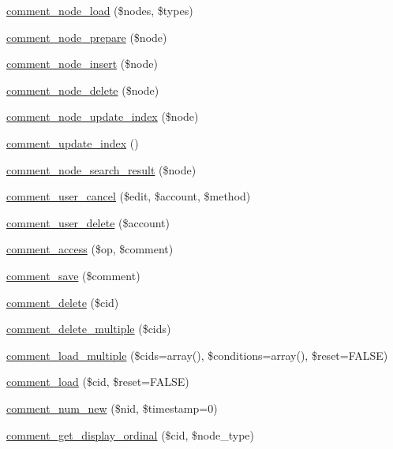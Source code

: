 \begin{DoxyCompactItemize}
\item 
\hyperlink{comment_8module_a3b04740955116c2ec6ec12db5f991d7c}{comment\_\-node\_\-load} (\$nodes, \$types)
\item 
\hyperlink{comment_8module_ad676dbb6ef26ede2da251447dc02f692}{comment\_\-node\_\-prepare} (\$node)
\item 
\hyperlink{comment_8module_ab1014a4769b972b796b1934da70fdf1f}{comment\_\-node\_\-insert} (\$node)
\item 
\hyperlink{comment_8module_a39ec63a49e728160e7a6ee16cb94c98d}{comment\_\-node\_\-delete} (\$node)
\item 
\hyperlink{comment_8module_a8810ffc5ce0ed7c78b997fe4e712913d}{comment\_\-node\_\-update\_\-index} (\$node)
\item 
\hyperlink{comment_8module_a50b866fc4c5da2c4a30a84ef4e2aac2d}{comment\_\-update\_\-index} ()
\item 
\hyperlink{comment_8module_a2f8892368f9c2044dab49523e87bbf7e}{comment\_\-node\_\-search\_\-result} (\$node)
\item 
\hyperlink{comment_8module_a8a9c4215c802259786fcb2a5526a1313}{comment\_\-user\_\-cancel} (\$edit, \$account, \$method)
\item 
\hyperlink{comment_8module_a9534e778a7cbfe56fd750997c8998ad8}{comment\_\-user\_\-delete} (\$account)
\item 
\hyperlink{comment_8module_a08e4627f1aaa3a4b06ec01b7c00a98e5}{comment\_\-access} (\$op, \$comment)
\item 
\hyperlink{comment_8module_a4ef5d3d2161511e0d09a560fb5004e82}{comment\_\-save} (\$comment)
\item 
\hyperlink{comment_8module_a6d3b67392abba22fa52fe27b9b3d0481}{comment\_\-delete} (\$cid)
\item 
\hyperlink{comment_8module_addaa817d25b383e341236a805ae6bea1}{comment\_\-delete\_\-multiple} (\$cids)
\item 
\hyperlink{comment_8module_a0cfb98e73c618190693b683c9bbfc0b1}{comment\_\-load\_\-multiple} (\$cids=array(), \$conditions=array(), \$reset=FALSE)
\item 
\hyperlink{comment_8module_ac1c8a5b8709abdfce125d928a4381c7e}{comment\_\-load} (\$cid, \$reset=FALSE)
\item 
\hyperlink{comment_8module_aea0352c132a14dde4c550fd2321ee67d}{comment\_\-num\_\-new} (\$nid, \$timestamp=0)
\item 
\hyperlink{comment_8module_ab171028b3ac34f4aa94800451582e997}{comment\_\-get\_\-display\_\-ordinal} (\$cid, \$node\_\-type)
\item 

\end{DoxyCompactItemize}
